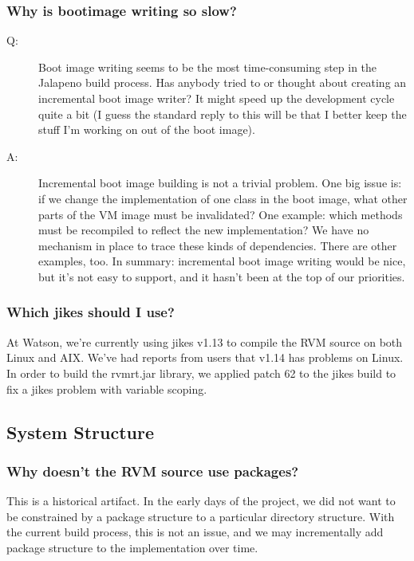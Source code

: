 \subsubsection{Why is bootimage writing so slow?} 
\begin{description}
\item [Q:] 
Boot image writing seems to be the most time-consuming step in the
Jalapeno build process.  Has anybody tried to or thought about
creating an incremental boot image writer? It might speed up the
development cycle quite a bit (I guess the standard reply to this will
be that I better keep the stuff I'm working on out of the boot image).

\item [A:]
Incremental boot image building is not a trivial problem.  One big
issue is: if we change the implementation of one class in the boot image,
what other parts of the VM image must be invalidated?  One example: which
methods must be recompiled to reflect the new implementation?  We have no
mechanism in place to trace these kinds of dependencies.  There are other
examples, too.  In summary: incremental boot image writing would be nice,
but it's not easy to support, and it hasn't been at the top of our
priorities.
\end{description}

\subsubsection{Which jikes should I use?}
At Watson, we're currently using jikes v1.13 to compile the RVM source on
both Linux and AIX.  We've had reports from users that v1.14 has problems
on Linux.  In order to build the rvmrt.jar library, we applied patch 62 to
the jikes build to fix a jikes problem with variable scoping.

\subsection{System Structure}

\subsubsection{Why doesn't the RVM source use packages?}

This is a historical artifact.  In the early days of the project, we did
not want to be constrained by a package structure to a particular
directory structure.  With the current build process, this is not an
issue, and we may incrementally add package structure to the
implementation over time.

